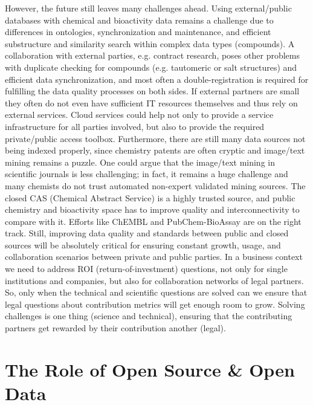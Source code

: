 \documentclass{sig-alternate}
\begin{document}
However, the future still leaves many challenges ahead. Using external/public databases
with chemical and bioactivity data remains a challenge due to differences in
ontologies, synchronization and maintenance, and efficient
substructure and similarity search within complex data types
(compounds). A
collaboration with external parties, e.g. contract research, poses other
problems with duplicate checking for compounds (e.g. tautomeric or salt
structures) and efficient data synchronization, and most often a double-registration is
required for fulfilling the data quality processes on both sides. If external
partners are small they often do not even have sufficient IT resources
themselves and thus rely on external services. Cloud services could help
not only to provide a service infrastructure for all parties involved,
but also to provide the required private/public access toolbox. Furthermore,
there are still many data sources not being indexed properly, since chemistry
patents are often cryptic and image/text mining remains a puzzle. One could
argue that the image/text mining in scientific journals is less challenging; in
fact, it remains a huge challenge and many chemists do not trust automated
non-expert validated mining sources. The closed CAS (Chemical Abstract Service)
is a highly trusted source, and public chemistry and bioactivity space has to
improve quality and interconnectivity to compare with it. Efforts like ChEMBL and PubChem-BioAssay
are on the right track. Still, improving data quality and standards between
public and closed sources will be absolutely critical for ensuring constant
growth, usage, and collaboration scenarios between private and public parties.
In a business context we need to address ROI (return-of-investment) questions, not only for single
institutions and companies, but also for collaboration networks of legal partners.
So, only when the technical and scientific questions are solved can we ensure that
legal questions about contribution metrics will get enough room to grow. Solving challenges is one thing (science and
technical),
ensuring that the contributing partners get rewarded by their contribution another (legal).

\section{The Role of Open Source \& Open Data}
\label{sec:role-open-source}
\end{document}
